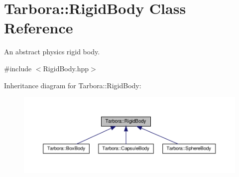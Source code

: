 \hypertarget{classTarbora_1_1RigidBody}{}\section{Tarbora\+:\+:Rigid\+Body Class Reference}
\label{classTarbora_1_1RigidBody}


An abstract physics rigid body.  




{\ttfamily \#include $<$Rigid\+Body.\+hpp$>$}



Inheritance diagram for Tarbora\+:\+:Rigid\+Body\+:\nopagebreak
\begin{figure}[H]
\begin{center}
\leavevmode
\includegraphics[width=350pt]{classTarbora_1_1RigidBody__inherit__graph}
\end{center}
\end{figure}
